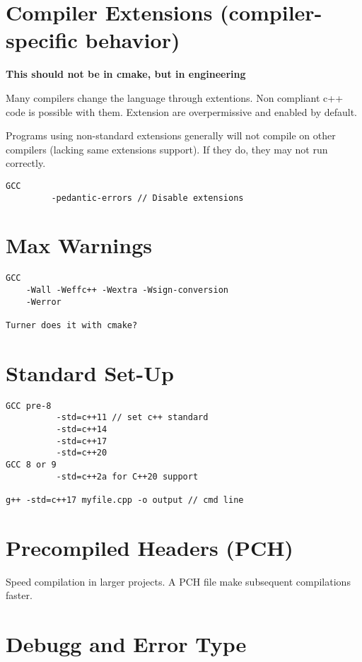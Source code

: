 \documentclass[openany]{report}
\begin{document}
\section{Compiler Extensions (compiler-specific behavior)}


\textbf{This should not be in cmake, but in engineering}


Many compilers change the language through extentions. Non compliant c++ code is possible with them.
Extension are overpermissive and enabled by default.


Programs using non-standard extensions generally will not compile on other compilers 
(lacking same extensions support). If they do, they may not run correctly.

\begin{verbatim}
GCC
         -pedantic-errors // Disable extensions
\end{verbatim}

\section{Max Warnings}

\begin{verbatim}
GCC 
    -Wall -Weffc++ -Wextra -Wsign-conversion
    -Werror

Turner does it with cmake?
\end{verbatim}

\section{Standard Set-Up}

\begin{verbatim}
GCC pre-8
          -std=c++11 // set c++ standard
          -std=c++14
          -std=c++17
          -std=c++20 
GCC 8 or 9
          -std=c++2a for C++20 support

g++ -std=c++17 myfile.cpp -o output // cmd line
\end{verbatim}

\section{Precompiled Headers (PCH)}

Speed compilation in larger projects. A PCH file make subsequent compilations faster.




\section{Debugg and Error Type}
\end{document}
